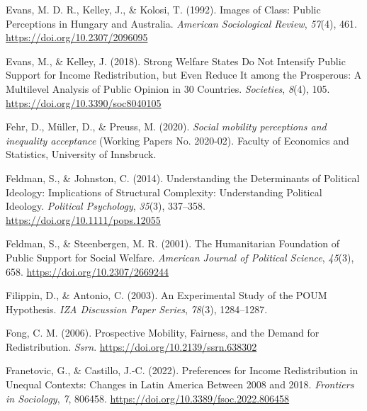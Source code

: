 \documentclass[
  12pt,
]{book}
\newlength{\cslhangindent}
\newlength{\cslentryspacingunit} %
\newenvironment{CSLReferences}[2] %
 {%
  \setlength{\parindent}{0pt}
  \ifodd #1
  \let\oldpar\par
  \def\par{\hangindent=\cslhangindent\oldpar}
  \fi
  \setlength{\parskip}{#2\cslentryspacingunit}
 }%
 {}
\begin{document}
\begin{CSLReferences}{1}{0}
\leavevmode{}%
Evans, M. D. R., Kelley, J., \& Kolosi, T. (1992). Images of {Class}: {Public Perceptions} in {Hungary} and {Australia}. \emph{American Sociological Review}, \emph{57}(4), 461. \url{https://doi.org/10.2307/2096095}

\leavevmode{}%
Evans, M., \& Kelley, J. (2018). Strong {Welfare States Do Not Intensify Public Support} for {Income Redistribution}, but {Even Reduce It} among the {Prosperous}: {A Multilevel Analysis} of {Public Opinion} in 30 {Countries}. \emph{Societies}, \emph{8}(4), 105. \url{https://doi.org/10.3390/soc8040105}

\leavevmode{}%
Fehr, D., Müller, D., \& Preuss, M. (2020). \emph{Social mobility perceptions and inequality acceptance} (Working Papers No. 2020-02). {Faculty of Economics and Statistics, University of Innsbruck}.

\leavevmode{}%
Feldman, S., \& Johnston, C. (2014). Understanding the {Determinants} of {Political Ideology}: {Implications} of {Structural Complexity}: {Understanding Political Ideology}. \emph{Political Psychology}, \emph{35}(3), 337--358. \url{https://doi.org/10.1111/pops.12055}

\leavevmode{}%
Feldman, S., \& Steenbergen, M. R. (2001). The {Humanitarian Foundation} of {Public Support} for {Social Welfare}. \emph{American Journal of Political Science}, \emph{45}(3), 658. \url{https://doi.org/10.2307/2669244}

\leavevmode{}%
Filippin, D., \& Antonio, C. (2003). An {Experimental Study} of the {POUM Hypothesis}. \emph{IZA Discussion Paper Series}, \emph{78}(3), 1284--1287.

\leavevmode{}%
Fong, C. M. (2006). Prospective {Mobility}, {Fairness}, and the {Demand} for {Redistribution}. \emph{Ssrn}. \url{https://doi.org/10.2139/ssrn.638302}

\leavevmode{}%
Franetovic, G., \& Castillo, J.-C. (2022). Preferences for {Income Redistribution} in {Unequal Contexts}: {Changes} in {Latin America Between} 2008 and 2018. \emph{Frontiers in Sociology}, \emph{7}, 806458. \url{https://doi.org/10.3389/fsoc.2022.806458}


\end{CSLReferences}
\end{document}
